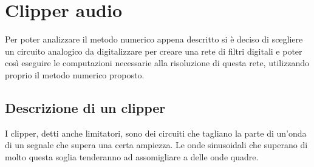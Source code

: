 \chapter{Clipper audio}
	Per poter analizzare il metodo numerico appena descritto si è deciso di scegliere un circuito analogico da digitalizzare per creare una rete di filtri digitali e poter così eseguire le computazioni necessarie alla risoluzione di questa rete, utilizzando proprio il metodo numerico proposto.
	
	\section{Descrizione di un clipper}
		I clipper, detti anche limitatori, sono dei circuiti che tagliano la parte di un'onda di un segnale che supera una certa ampiezza. Le onde sinusoidali che superano di molto questa soglia tenderanno ad assomigliare a delle onde quadre.
		
